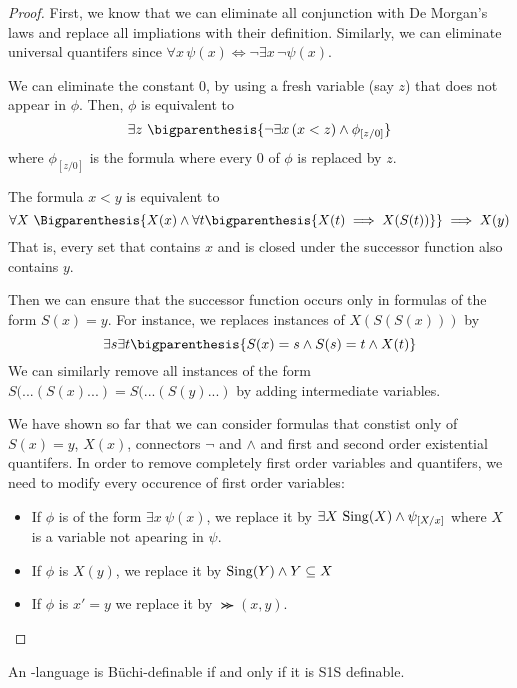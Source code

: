 \begin{proof}
    First, we know that we can eliminate all conjunction with De Morgan's
    laws and replace all impliations with their definition. Similarly, we can eliminate universal quantifers
    since $\forall x\, \psi(x) \iff \neg \exists x\, \neg \psi(x)$.

    We can eliminate the constant $0$, by using a fresh variable (say $z$)
    that does not appear in $\phi$. Then, $\phi$ is equivalent to
    \[
        \exists z~ \bigparenthesis{\neg\exists x\, (x < z) \wedge \phi_{[z/0]}}
    \]
    where $\phi_{[z/0]}$ is the formula where every 0 of $\phi$ is replaced by $z$.

    The formula $x < y$ is equivalent to \[
        \forall X~ \Bigparenthesis{
            X(x) \wedge \forall t \bigparenthesis{X(t) \implies X(S(t))}
        } \implies X(y)
    \]
    That is, every set that contains $x$ and is closed under the successor
    function also contains $y$.

    Then we can ensure that the successor function occurs only
    in formulas of the form $S(x) = y$. For instance,
    we replaces instances of $X(S(S(x)))$ by \[
        \exists s \exists t \bigparenthesis{
            S(x) = s \wedge S(s) = t \wedge X(t)
        }
    \]
    We can similarly remove all instances of the form $S(...(S(x)...) = S(...(S(y)...)$
    by adding intermediate variables.

    We have shown so far that we can consider formulas
    that constist only of $S(x) = y$, $X(x)$, connectors $\neg$ and $\wedge$
    and first and second order existential quantifers.
    In order to remove completely first order variables and quantifers,
    we need to modify every occurence of first order variables:
    \begin{itemize}
        \item If $\phi$ is of the form $\exists x~ \psi(x)$, we replace it by
            $\exists X ~ \mathrm{Sing}(X) \wedge \psi_{[X/x]}$ where $X$ is a variable not apearing
            in $\psi$.
        \item If $\phi$ is $X(y)$, we replace it by $\mathrm{Sing}(Y) \wedge Y \subseteq X$
        \item If $\phi$ is $x' = y$ we replace it by $\Succ(x, y)$.
    \end{itemize}
\end{proof}

\begin{theorem}
    An \w-language is Büchi-definable if and only if
    it is S1S definable.
\end{theorem}

